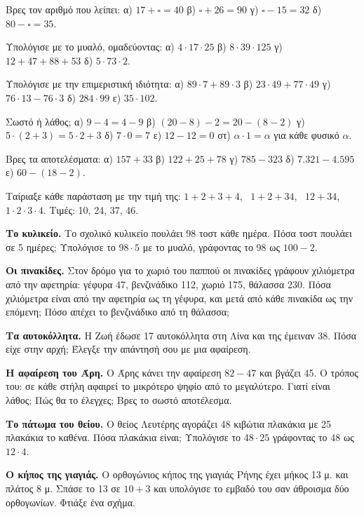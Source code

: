 \ex Βρες τον αριθμό που λείπει: α) $17+\square=40$ \quad β) $\square+26=90$ \quad γ) $\square-15=32$ \quad δ) $80-\square=35$.

\ex Υπολόγισε με το μυαλό, ομαδεύοντας: α) $4\cdot 17\cdot 25$ \quad β) $8\cdot 39\cdot 125$ \quad γ) $12+47+88+53$ \quad δ) $5\cdot 73\cdot 2$.

\ex Υπολόγισε με την επιμεριστική ιδιότητα: α) $89\cdot 7+89\cdot 3$ \quad β) $23\cdot 49+77\cdot 49$ \quad γ) $76\cdot 13-76\cdot 3$ \quad δ) $284\cdot 99$ \quad ε) $35\cdot 102$.

\ex Σωστό ή λάθος; α) $9-4=4-9$ \quad β) $(20-8)-2=20-(8-2)$ \quad γ) $5\cdot(2+3)=5\cdot 2+3$ \quad δ) $7\cdot 0=7$ \quad ε) $12-12=0$ \quad στ) $\alpha\cdot 1=\alpha$ για κάθε φυσικό $\alpha$.

\ex Βρες τα αποτελέσματα: α) $157+33$ \quad β) $122+25+78$ \quad γ) $785-323$ \quad δ) $7.321-4.595$ \quad ε) $60-(18-2)$.

\ex Ταίριαξε κάθε παράσταση με την τιμή της: $1+2+3+4$, \ $1+2+34$, \ $12+34$, \ $1\cdot 2\cdot 3\cdot 4$. Τιμές: 10, 24, 37, 46.


\ex \textbf{Το κυλικείο.} Το σχολικό κυλικείο πουλάει 98 τοστ κάθε ημέρα. Πόσα τοστ πουλάει σε 5 ημέρες; Υπολόγισε το $98\cdot 5$ με το μυαλό, γράφοντας το 98 ως $100-2$.

\ex \textbf{Οι πινακίδες.} Στον δρόμο για το χωριό του παππού οι πινακίδες γράφουν χιλιόμετρα από την αφετηρία: γέφυρα 47, βενζινάδικο 112, χωριό 175, θάλασσα 230. Πόσα χιλιόμετρα είναι από την αφετηρία ως τη γέφυρα, και μετά από κάθε πινακίδα ως την επόμενη; Πόσο απέχει το βενζινάδικο από τη θάλασσα;

\ex \textbf{Τα αυτοκόλλητα.} Η Ζωή έδωσε 17 αυτοκόλλητα στη Λίνα και της έμειναν 38. Πόσα είχε στην αρχή; Έλεγξε την απάντησή σου με μια αφαίρεση.

\ex \textbf{Η αφαίρεση του Άρη.} Ο Άρης κάνει την αφαίρεση $82-47$ και βγάζει 45. Ο τρόπος του: σε κάθε στήλη αφαιρεί το μικρότερο ψηφίο από το μεγαλύτερο. Γιατί είναι λάθος; Πώς θα το έλεγχες; Βρες το σωστό αποτέλεσμα.

\ex \textbf{Το πάτωμα του θείου.} Ο θείος Λευτέρης αγοράζει 48 κιβώτια πλακάκια με 25 πλακάκια το καθένα. Πόσα πλακάκια είναι; Υπολόγισε το $48\cdot 25$ γράφοντας το 48 ως $12\cdot 4$.

\ex \textbf{Ο κήπος της γιαγιάς.} Ο ορθογώνιος κήπος της γιαγιάς Ρήνης έχει μήκος 13 μ. και πλάτος 8 μ. Σπάσε το 13 σε $10+3$ και υπολόγισε το εμβαδό του σαν άθροισμα δύο ορθογωνίων. Φτιάξε ένα σχήμα.

